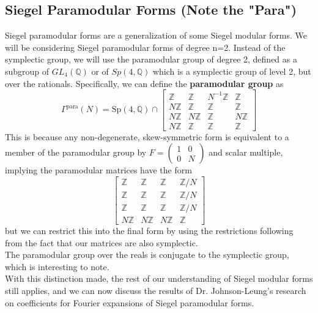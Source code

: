 \documentclass[11pt, oneside]{amsart}
\begin{document}
\subsection{Siegel Paramodular Forms (Note the "Para")}
Siegel paramodular forms are a generalization of some Siegel modular forms. We will be considering Siegel paramodular forms of degree n=2. Instead of the symplectic group, we will use the paramodular group of degree 2, defined as a subgroup of $GL_{4}(\mathbb{Q})$ or of $Sp(4,\mathbb{Q})$ which is a symplectic group of level 2, but over the rationals.
Specifically, we can define the \textbf{paramodular group} as $$\Gamma^{\operatorname{para}}(N)=\mathrm{Sp}(4, \mathbb{Q}) \cap \left[ \begin{array}{cccc}{\mathbb{Z}} & {\mathbb{Z}} & {N^{-1} \mathbb{Z}} & {\mathbb{Z}} \\ {N \mathbb{Z}} & {\mathbb{Z}} & {\mathbb{Z}} & {\mathbb{Z}} \\ {N \mathbb{Z}} & {N \mathbb{Z}} & {\mathbb{Z}} & {N \mathbb{Z}} \\ {N \mathbb{Z}} & {\mathbb{Z}} & {\mathbb{Z}} & {\mathbb{Z}}\end{array}\right]$$
This is because any non-degenerate, skew-symmetric form is equivalent to a member of the paramodular group by $F=\left( \begin{array}{ll}{1} & {0} \\ {0} & {N}\end{array}\right)$ and scalar multiple, implying the paramodular matrices have the form $$\left[ \begin{array}{cccc}{\mathbb{Z}} & {\mathbb{Z}} & {\mathbb{Z}} & {\mathbb{Z} / N} \\ {\mathbb{Z}} & {\mathbb{Z}} & {\mathbb{Z}} & {\mathbb{Z} / N} \\ {\mathbb{Z}} & {\mathbb{Z}} & {\mathbb{Z}} & {\mathbb{Z} / N} \\ {N \mathbb{Z}} & {N \mathbb{Z}} & {N \mathbb{Z}} & {\mathbb{Z}}\end{array}\right]$$ but we can restrict this into the final form by using the restrictions following from the fact that our matrices are also symplectic.\\
The paramodular group over the reals is conjugate to the symplectic group, which is interesting to note.\\
With this distinction made, the rest of our understanding of Siegel modular forms still applies, and we can now discuss the results of Dr. Johnson-Leung's research on coefficients for Fourier expansions of Siegel paramodular forms.
\end{document}
